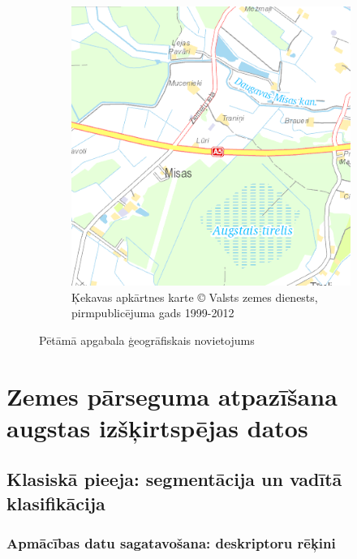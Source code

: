 \documentclass[12pt,paper=a4]{report}
\begin{document}
\begin{figure}[h!]
\begin{subfigure}[b]{.49\linewidth}
\includegraphics[width=\linewidth]{kekavaKarte}
\caption{Ķekavas apkārtnes karte © Valsts zemes dienests, pirmpublicējuma gads 1999-2012}
\label{fig:kekavaKarte}
\end{subfigure}
\caption{Pētāmā apgabala ģeogrāfiskais novietojums}
\end{figure}
\chapter{Zemes pārseguma atpazīšana augstas izšķirtspējas datos}
\section{Klasiskā pieeja: segmentācija un vadītā klasifikācija}
\subsection{Apmācības datu sagatavošana: deskriptoru rēķini}
\end{document}
